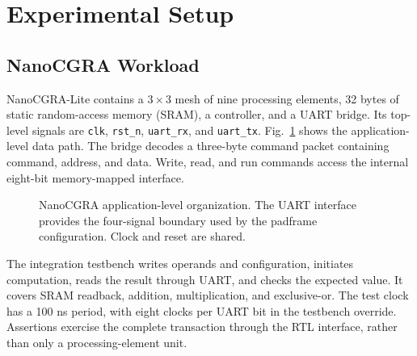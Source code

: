 \documentclass[conference,letterpaper]{IEEEtran}
\begin{document}
\section{Experimental Setup}
\subsection{NanoCGRA Workload}
NanoCGRA-Lite contains a $3\times3$ mesh of nine processing elements, 32 bytes of static random-access memory (SRAM), a controller, and a UART bridge. Its top-level signals are \texttt{clk}, \texttt{rst\_n}, \texttt{uart\_rx}, and \texttt{uart\_tx}. Fig.~\ref{fig:nano} shows the application-level data path. The bridge decodes a three-byte command packet containing command, address, and data. Write, read, and run commands access the internal eight-bit memory-mapped interface.

\begin{figure}[t]
\centering
{}
\caption{NanoCGRA application-level organization. The UART interface provides the four-signal boundary used by the padframe configuration. Clock and reset are shared.}
\label{fig:nano}
\end{figure}

The integration testbench writes operands and configuration, initiates computation, reads the result through UART, and checks the expected value. It covers SRAM readback, addition, multiplication, and exclusive-or. The test clock has a 100 ns period, with eight clocks per UART bit in the testbench override. Assertions exercise the complete transaction through the RTL interface, rather than only a processing-element unit.
\end{document}
